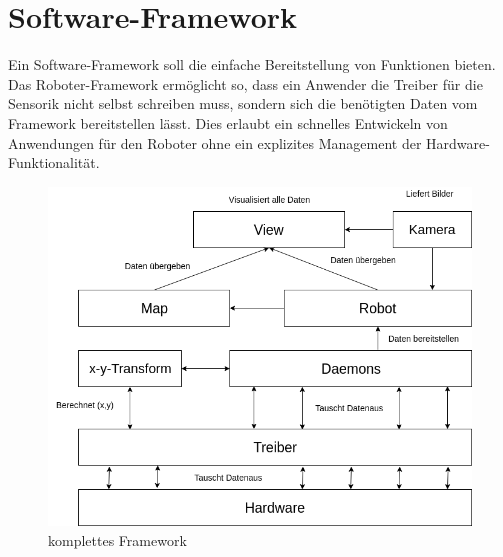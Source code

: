 \documentclass[twoside,11pt, a4paper]{report}
\begin{document}
	\FloatBarrier
	\section{Software-Framework}
	Ein Software-Framework soll die einfache Bereitstellung von Funktionen bieten. Das Roboter-Framework ermöglicht so, dass ein Anwender die Treiber für die Sensorik nicht selbst schreiben muss, sondern sich die benötigten Daten vom Framework bereitstellen lässt. Dies erlaubt ein schnelles Entwickeln von Anwendungen für den Roboter ohne ein explizites Management der Hardware-Funktionalität. 
	
	\begin{figure}[!htb]
		\centering
		\includegraphics[scale=0.50]{images/Framework.png}
		\caption{komplettes Framework}
	\end{figure}
	
\end{document}
